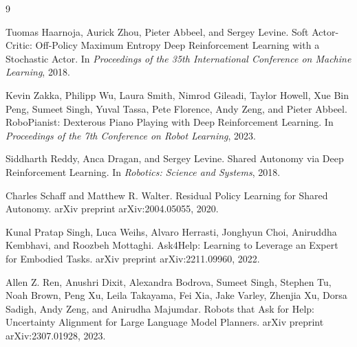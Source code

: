 \documentclass[11pt]{article}
\begin{document}
\begin{thebibliography}{9}

Tuomas Haarnoja, Aurick Zhou, Pieter Abbeel, and Sergey Levine.
\newblock Soft Actor-Critic: Off-Policy Maximum Entropy Deep Reinforcement Learning with a Stochastic Actor.
\newblock In \emph{Proceedings of the 35th International Conference on Machine Learning}, 2018.

Kevin Zakka, Philipp Wu, Laura Smith, Nimrod Gileadi, Taylor Howell, Xue Bin Peng, Sumeet Singh, Yuval Tassa, Pete Florence, Andy Zeng, and Pieter Abbeel.
\newblock RoboPianist: Dexterous Piano Playing with Deep Reinforcement Learning.
\newblock In \emph{Proceedings of the 7th Conference on Robot Learning}, 2023.

Siddharth Reddy, Anca Dragan, and Sergey Levine.
\newblock Shared Autonomy via Deep Reinforcement Learning.
\newblock In \emph{Robotics: Science and Systems}, 2018.

Charles Schaff and Matthew R. Walter.
\newblock Residual Policy Learning for Shared Autonomy.
\newblock arXiv preprint arXiv:2004.05055, 2020.

Kunal Pratap Singh, Luca Weihs, Alvaro Herrasti, Jonghyun Choi, Aniruddha Kembhavi, and Roozbeh Mottaghi.
\newblock Ask4Help: Learning to Leverage an Expert for Embodied Tasks.
\newblock arXiv preprint arXiv:2211.09960, 2022.

Allen Z. Ren, Anushri Dixit, Alexandra Bodrova, Sumeet Singh, Stephen Tu, Noah Brown, Peng Xu, Leila Takayama, Fei Xia, Jake Varley, Zhenjia Xu, Dorsa Sadigh, Andy Zeng, and Anirudha Majumdar.
\newblock Robots that Ask for Help: Uncertainty Alignment for Large Language Model Planners.
\newblock arXiv preprint arXiv:2307.01928, 2023.

\end{thebibliography}
\end{document}
